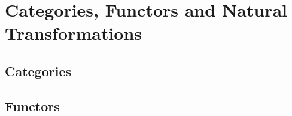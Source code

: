 \chapter{Categories, Functors and Natural Transformations}





\section{Categories}
\addtocounter{subsection}{11}









\section{Functors}
\addtocounter{subsection}{19}



